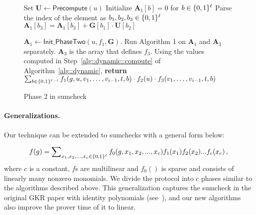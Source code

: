 \begin{figure}[t!]
	\begin{algorithm}[H]
		\caption{Phase 2 in sumcheck}\label{alg::phase2}
		\begin{algorithmic}[1]
			 
			\State Set $\textbf{U} \leftarrow \mathsf{Precompute}(u)$
			\State Initialize $\textbf{A}_1[b] = 0$ for $b\in\{0,1\}^\ell$
			\State Parse the index of the element as $b_1,b_2,b_3\in\{0,1\}^\ell$
			\State\label{alg::phase2::init} $\textbf{A}_1[b_3] = \textbf{A}_1[b_3]+ \textbf{G}[b_1]\cdot\textbf{U}[b_2]$
			\EndFor
			\EndProcedure
			
			\State $\textbf{A}_1\leftarrow\mathsf{Init\_PhaseTwo}(u,f_1,\textbf{G})$. 
			\State Run Algorithm 1 on $\textbf{A}_1$ and $\textbf{A}_3$ separately. $\textbf{A}_3$ is the array that defines $f_3$. Using the values computed in Step~\ref{alg::dynamic::compute} of Algorithm~\ref{alg::dynamic},
			\State \textbf{return} $\sum_{b\in\{0,1\}^{\ell-i}}f_1(g,u, v_1, \ldots,v_{i-1}, t, b)\cdot f_2(u)\cdot f_3(v_1, \ldots,v_{i-1}, t, b)$
			\EndFor
			\EndFor
			
			\EndProcedure
		\end{algorithmic}
	\end{algorithm}
	
	\vspace{-.5in}
\end{figure}


\paragraph{Generalizations.}
Our technique can be extended to sumchecks with a general form below:

\[
f(g) = \sum\nolimits_{x_1, x_2, ..., x_c\in\{0,1\}^\ell}f_0(g,x_1, x_2, ..., x_c)f_1(x_1)f_2(x_2)...f_c(x_c)\, ,
\]
where $c$ is a constant, $f$s are multilinear and $f_0()$ is sparse and consists of linearly many nonzero monomials. We divide the protocol into $c$ phases similar to the algorithms described above. This generalization captures the sumcheck in the original GKR paper with identity polynomials (see~\cite{GKR}), and our new algorithms also improve the prover time of it to linear.

